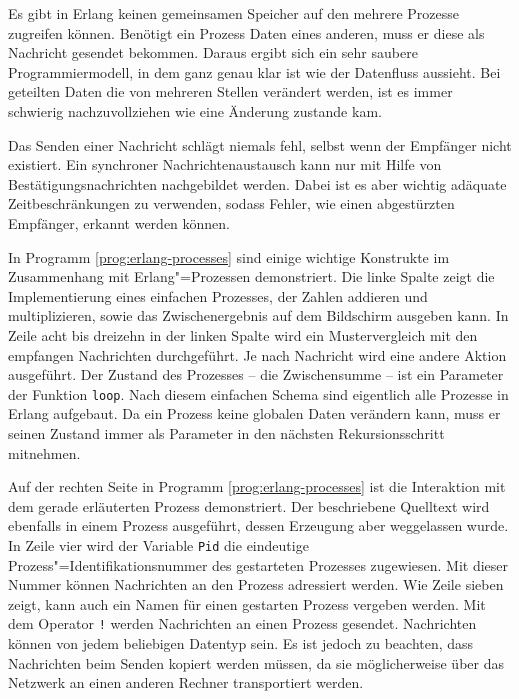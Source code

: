 Es gibt in Erlang keinen gemeinsamen Speicher auf den mehrere Prozesse zugreifen können. Benötigt ein Prozess Daten eines anderen, muss er diese als Nachricht gesendet bekommen. Daraus ergibt sich ein sehr saubere Programmiermodell, in dem ganz genau klar ist wie der Datenfluss aussieht. Bei geteilten Daten die von mehreren Stellen verändert werden, ist es immer schwierig nachzuvollziehen wie eine Änderung zustande kam.

Das Senden einer Nachricht schlägt niemals fehl, selbst wenn der Empfänger nicht existiert. Ein synchroner Nachrichtenaustausch kann nur mit Hilfe von Bestätigungsnachrichten nachgebildet werden. Dabei ist es aber wichtig adäquate Zeitbeschränkungen zu verwenden, sodass Fehler, wie \zB einen abgestürzten Empfänger, erkannt werden können.

In Programm \ref{prog:erlang-processes} sind einige wichtige Konstrukte im Zusammenhang mit Erlang"=Prozessen demonstriert. Die linke Spalte zeigt die Implementierung eines einfachen Prozesses, der Zahlen addieren und multiplizieren, sowie das Zwischenergebnis auf dem Bildschirm ausgeben kann. In Zeile acht bis dreizehn in der linken Spalte wird ein Mustervergleich mit den empfangen Nachrichten durchgeführt. Je nach Nachricht wird eine andere Aktion ausgeführt. Der Zustand des Prozesses -- die Zwischensumme -- ist ein Parameter der Funktion \lstinline{loop}. Nach diesem einfachen Schema sind eigentlich alle Prozesse in Erlang aufgebaut. Da ein Prozess keine globalen Daten verändern kann, muss er seinen Zustand immer als Parameter in den nächsten Rekursionsschritt mitnehmen.

Auf der rechten Seite in Programm \ref{prog:erlang-processes} ist die Interaktion mit dem gerade erläuterten Prozess demonstriert. Der beschriebene Quelltext wird ebenfalls in einem Prozess ausgeführt, dessen Erzeugung aber weggelassen wurde. In Zeile vier wird der Variable \lstinline{Pid} die eindeutige Prozess"=Identifikationsnummer des gestarteten Prozesses zugewiesen. Mit dieser Nummer können Nachrichten an den Prozess adressiert werden. Wie Zeile sieben zeigt, kann auch ein Namen für einen gestarten Prozess vergeben werden. Mit dem Operator \lstinline{!} werden Nachrichten an einen Prozess gesendet. Nachrichten können von jedem beliebigen Datentyp sein. Es ist jedoch zu beachten, dass Nachrichten beim Senden kopiert werden müssen, da sie möglicherweise über das Netzwerk an einen anderen Rechner transportiert werden.

